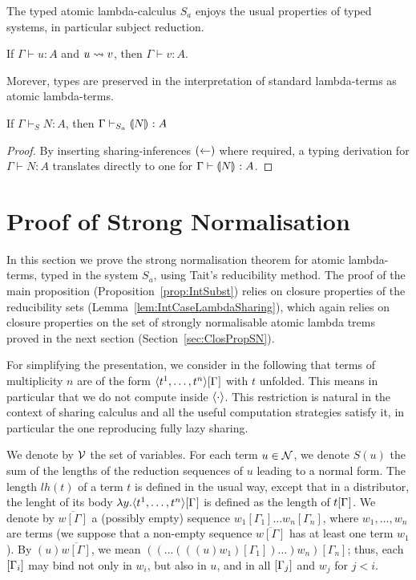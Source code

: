 \documentclass[orivec]{llncs}
\begin{document}
The typed atomic lambda-calculus ${S_a}$ enjoys the usual properties of typed systems, in particular subject reduction.


\begin{ALtheorem}
If $\Gamma\vdash u : A$ and $u \rewrite v$, then $\Gamma\vdash v : A$.
\end{ALtheorem}

\noindent
Morever, types are preserved in the interpretation of standard lambda-terms as atomic lambda-terms.

\begin{ALproposition}\label{prop:types preserved}
If $\Gamma\vdash_S N:A$, then $\Gamma\vdash_{S_a} {\llparenthesis{N}\rrparenthesis_{{}}}:A$
\end{ALproposition}

\begin{proof}
%
By inserting sharing-inferences $({\leftarrow})$ where required, a typing derivation for $\Gamma \vdash N : A$ translates directly to one for $\Gamma\vdash {\llparenthesis{N}\rrparenthesis_{{}}} : A$.
\end{proof}




\section{Proof of Strong Normalisation}\label{sec:SNproof}

In this section we prove the strong normalisation theorem for atomic lambda-terms, typed in the system $S_a$,
using Tait's reducibility method. The proof of the main proposition (Proposition~\ref{prop:IntSubst}) relies on closure properties of the reducibility sets (Lemma~\ref{lem:IntCaseLambdaSharing}), which again relies on closure properties on the set of strongly normalisable atomic lambda trems proved in the next section (Section~\ref{sec:ClosPropSN}).

For simplifying the presentation, we consider in the following that terms of multiplicity $n$ are of the form $\langle t^1,\dots, t^n \rangle\G$ with $t$ unfolded. This means in particular that we do not compute inside $\tup*\cdot$. This
restriction is  natural in the context of sharing calculus and all the useful computation strategies satisfy it, in particular the one reproducing fully lazy sharing.


We denote by $\mathcal{V}$ the set of variables.
For each term $u \in \mathcal{N}$, we denote $S(u)$ the sum of the lengths of the reduction sequences of $u$ leading to a normal form. The length $lh(t)$ of a term $t$ is defined in the usual way, except that in a distributor, the lenght of its body $\lambda y.\langle t^1,\dots, t^n \rangle\G$ is defined as the length of $t\G$.
We denote by $\overline{w[\Gamma]}$ a (possibly empty) sequence $w_1[\Gamma_1]\dots w_n[\Gamma_n]$, where $w_1,\dots ,w_n$ are terms (we suppose that a non-empty sequence  $\overline{w[\Gamma]}$ has at least one term $w_1$).
By $(u)\overline{w[\Gamma]}$, we mean $((...(((u)w_1)[\Gamma_1])\dots )w_n)[\Gamma_n]$; thus, each $\G[i]$ may bind not only in $w_i$, but also in $u$, and in all $\G[j]$ and $w_j$ for $j<i$.
\end{document}
